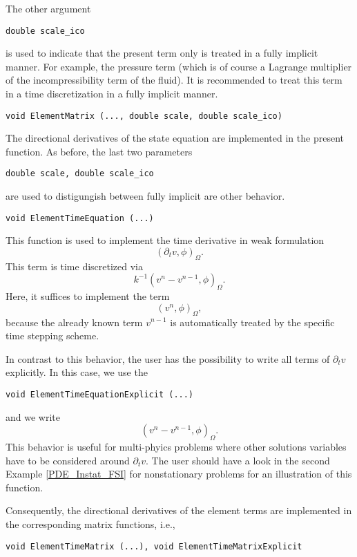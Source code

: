 The other argument
\begin{verbatim}
double scale_ico
\end{verbatim} 
is used to indicate that the present term 
only is treated in a fully implicit manner. 
For example, the pressure term (which is of course
a Lagrange multiplier of the incompressibility 
term of the fluid). It is recommended to treat 
this term in a time discretization in a fully 
implicit manner. 

\begin{verbatim}
void ElementMatrix (..., double scale, double scale_ico)
\end{verbatim}
The directional derivatives of the state equation
are implemented in the present function. As before,
the last two parameters
\begin{verbatim}
double scale, double scale_ico
\end{verbatim} 
are used to distigungish between fully implicit 
are other behavior. 

\begin{verbatim}
void ElementTimeEquation (...) 
\end{verbatim}
This function is used to implement the 
time derivative in weak formulation 
\begin{equation*}
(\partial_t v, \phi)_{\Omega}.
\end{equation*}
This term is time discretized via
\begin{equation*}
k^{-1} (v^n - v^{n-1} , \phi)_{\Omega}. 
\end{equation*}
Here, it suffices to implement the term
\begin{equation*}
(v^n, \phi)_{\Omega},
\end{equation*}
because the already known term $v^{n-1}$ is 
automatically treated by the specific time
stepping scheme. 

In contrast to this behavior, the user 
has the possibility to write all terms of 
$\partial_t v$ explicitly. In this case, we 
use the 
\begin{verbatim}
void ElementTimeEquationExplicit (...) 
\end{verbatim}
and we write 
\begin{equation*}
(v^n - v^{n-1}, \phi)_{\Omega}.
\end{equation*}
This behavior is useful for multi-phyics problems
where other solutions variables have to be considered
around $\partial_t v$. The user should have a look 
in the second Example 
\ref{PDE_Instat_FSI} for nonstationary problems 
for an illustration
of this function. 

Consequently, the directional derivatives of the 
element terms are implemented in the corresponding
matrix functions, i.e., 
\begin{verbatim}
void ElementTimeMatrix (...), void ElementTimeMatrixExplicit 
\end{verbatim}


